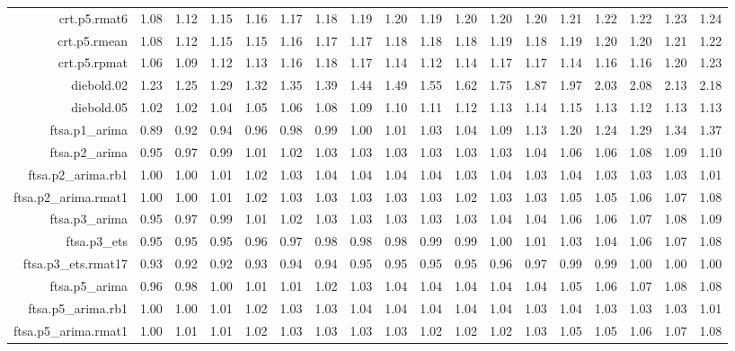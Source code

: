 \begin{tabular}{rrrrrrrrrrrrrrrrrr}
  crt.p5.rmat6 & 1.08 & 1.12 & 1.15 & 1.16 & 1.17 & 1.18 & 1.19 & 1.20 & 1.19 & 1.20 & 1.20 & 1.20 & 1.21 & 1.22 & 1.22 & 1.23 & 1.24 \\ 
  crt.p5.rmean & 1.08 & 1.12 & 1.15 & 1.15 & 1.16 & 1.17 & 1.17 & 1.18 & 1.18 & 1.18 & 1.19 & 1.18 & 1.19 & 1.20 & 1.20 & 1.21 & 1.22 \\ 
  crt.p5.rpmat & 1.06 & 1.09 & 1.12 & 1.13 & 1.16 & 1.18 & 1.17 & 1.14 & 1.12 & 1.14 & 1.17 & 1.17 & 1.14 & 1.16 & 1.16 & 1.20 & 1.23 \\ 
  diebold.02 & 1.23 & 1.25 & 1.29 & 1.32 & 1.35 & 1.39 & 1.44 & 1.49 & 1.55 & 1.62 & 1.75 & 1.87 & 1.97 & 2.03 & 2.08 & 2.13 & 2.18 \\ 
  diebold.05 & 1.02 & 1.02 & 1.04 & 1.05 & 1.06 & 1.08 & 1.09 & 1.10 & 1.11 & 1.12 & 1.13 & 1.14 & 1.15 & 1.13 & 1.12 & 1.13 & 1.13 \\ 
  ftsa.p1\_arima & 0.89 & 0.92 & 0.94 & 0.96 & 0.98 & 0.99 & 1.00 & 1.01 & 1.03 & 1.04 & 1.09 & 1.13 & 1.20 & 1.24 & 1.29 & 1.34 & 1.37 \\ 
  ftsa.p2\_arima & 0.95 & 0.97 & 0.99 & 1.01 & 1.02 & 1.03 & 1.03 & 1.03 & 1.03 & 1.03 & 1.03 & 1.04 & 1.06 & 1.06 & 1.08 & 1.09 & 1.10 \\ 
  ftsa.p2\_arima.rb1 & 1.00 & 1.00 & 1.01 & 1.02 & 1.03 & 1.04 & 1.04 & 1.04 & 1.04 & 1.03 & 1.04 & 1.03 & 1.04 & 1.03 & 1.03 & 1.03 & 1.01 \\ 
  ftsa.p2\_arima.rmat1 & 1.00 & 1.00 & 1.01 & 1.02 & 1.03 & 1.03 & 1.03 & 1.03 & 1.03 & 1.02 & 1.03 & 1.03 & 1.05 & 1.05 & 1.06 & 1.07 & 1.08 \\ 
  ftsa.p3\_arima & 0.95 & 0.97 & 0.99 & 1.01 & 1.02 & 1.03 & 1.03 & 1.03 & 1.03 & 1.03 & 1.04 & 1.04 & 1.06 & 1.06 & 1.07 & 1.08 & 1.09 \\ 
  ftsa.p3\_ets & 0.95 & 0.95 & 0.95 & 0.96 & 0.97 & 0.98 & 0.98 & 0.98 & 0.99 & 0.99 & 1.00 & 1.01 & 1.03 & 1.04 & 1.06 & 1.07 & 1.08 \\ 
  ftsa.p3\_ets.rmat17 & 0.93 & 0.92 & 0.92 & 0.93 & 0.94 & 0.94 & 0.95 & 0.95 & 0.95 & 0.95 & 0.96 & 0.97 & 0.99 & 0.99 & 1.00 & 1.00 & 1.00 \\ 
  ftsa.p5\_arima & 0.96 & 0.98 & 1.00 & 1.01 & 1.01 & 1.02 & 1.03 & 1.04 & 1.04 & 1.04 & 1.04 & 1.04 & 1.05 & 1.06 & 1.07 & 1.08 & 1.08 \\ 
  ftsa.p5\_arima.rb1 & 1.00 & 1.00 & 1.01 & 1.02 & 1.03 & 1.03 & 1.04 & 1.04 & 1.04 & 1.04 & 1.04 & 1.03 & 1.04 & 1.03 & 1.03 & 1.03 & 1.01 \\ 
  ftsa.p5\_arima.rmat1 & 1.00 & 1.01 & 1.01 & 1.02 & 1.03 & 1.03 & 1.03 & 1.03 & 1.02 & 1.02 & 1.02 & 1.03 & 1.05 & 1.05 & 1.06 & 1.07 & 1.08 \\ 

\end{tabular}
